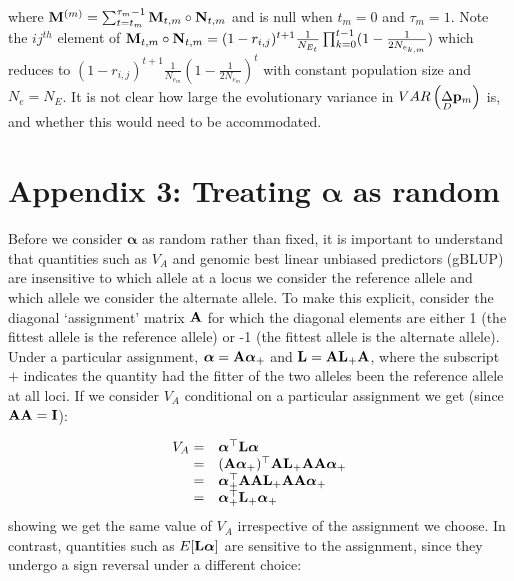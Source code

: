 \documentclass[12pt]{article}
\begin{document}
\begin{bibunit}
where ${\bf M}^{(m)}=\sum_{t=t_m}^{\tau_m-1}{\bf M}_{t,m}\circ{\bf N}_{t,m}$ and is null when $t_m=0$ and $\tau_m=1$.  Note the $ij^{th}$ element of ${\bf M}_{t,m}\circ{\bf N}_{t,m}=(1-r_{i,j})^{t+1}\frac{1}{N_{E_t}}\prod_{k=0}^{t-1}(1-\frac{1}{2N_{e_{k,m}}})$ which reduces to $(1-r_{i,j})^{t+1}\frac{1}{N_{e_m}}(1-\frac{1}{2N_{e_m}})^{t}$ with constant population size and $N_e=N_E$. It is not clear how large the evolutionary variance in $VAR\left(\underset{D}\Delta {\bf p}_{m}\right)$ is, and whether this would need to be accommodated.

\section{Appendix 3: Treating $\boldsymbol{\alpha}$ as random}
\label{App:alpha_random}


Before we consider $\boldsymbol{\alpha}$ as random rather than fixed, it is important to understand that quantities such as $V_A$ and genomic best linear unbiased predictors (gBLUP) are insensitive to which allele at a locus we consider the reference allele and which allele we consider the alternate allele. To make this explicit, consider the diagonal `assignment' matrix ${\bf A}$ for which the diagonal elements are either 1 (the fittest allele is the reference allele) or -1 (the fittest allele is the alternate allele). Under a particular assignment, $\boldsymbol{\alpha}={\bf A}\boldsymbol{\alpha}_{+}$ and ${\bf L}={\bf A}{\bf L}_{+}{\bf A}$, where the subscript $+$ indicates the quantity had the fitter of the two alleles been the reference allele at all loci. If we consider $V_A$ conditional on a particular assignment we get (since ${\bf A}{\bf A}={\bf I}$):


\begin{equation}
\begin{array}{rl}
V_A =& \boldsymbol{\alpha}^{\top}{\bf L}\boldsymbol{\alpha}\\
    =& ({\bf A}\boldsymbol{\alpha}_{+})^{\top}{\bf A}{\bf L}_{+}{\bf A}{\bf A}\boldsymbol{\alpha}_{+}\\
    =& \boldsymbol{\alpha}_{+}^{\top}{\bf A}{\bf A}{\bf L}_{+}{\bf A}{\bf A}\boldsymbol{\alpha}_{+}\\
    =& \boldsymbol{\alpha}_{+}^{\top}{\bf L}_{+}\boldsymbol{\alpha}_{+}\\
\end{array}
\end{equation}
showing we get the same value of $V_A$ irrespective of the assignment we choose.  In contrast, quantities such as $E[{\bf L}\boldsymbol{\alpha}]$ are sensitive to the assignment, since they undergo a sign reversal under a different choice: 


\end{bibunit}
\end{document}
